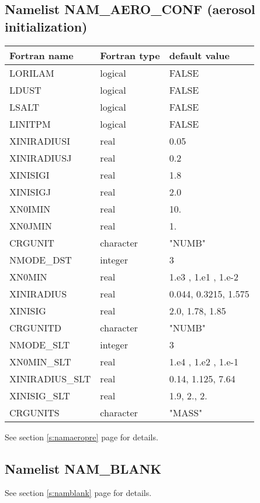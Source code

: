 \subsection{Namelist NAM\_AERO\_CONF (aerosol initialization)}
\begin{longtable} {|p{}|p{}|p{}|}
\hline
Fortran name &  Fortran type & default value \\
\hline 
\endhead
\hline
\endfoot
LORILAM      & logical       & FALSE    \\
LDUST        & logical       & FALSE    \\
LSALT        & logical       & FALSE    \\
LINITPM      & logical       & FALSE    \\
XINIRADIUSI  & real          & 0.05     \\
XINIRADIUSJ  & real          & 0.2      \\
XINISIGI     & real          & 1.8      \\
XINISIGJ     & real          & 2.0      \\
XN0IMIN      & real          & 10.      \\
XN0JMIN      & real          & 1.       \\
CRGUNIT      & character     & "NUMB"   \\
NMODE\_DST   & integer       & 3       \\
XN0MIN       & real          & 1.e3 , 1.e1 , 1.e-2 \\
XINIRADIUS   & real          & 0.044, 0.3215, 1.575 \\
XINISIG      & real          & 2.0, 1.78, 1.85 \\
CRGUNITD     & character     & "NUMB"   \\
NMODE\_SLT   & integer       & 3       \\
XN0MIN\_SLT  & real          & 1.e4 , 1.e2 , 1.e-1 \\
XINIRADIUS\_SLT & real       & 0.14, 1.125,  7.64\\
XINISIG\_SLT    & real       & 1.9, 2., 2. \\
CRGUNITS     & character     & "MASS"   \\
\end{longtable}

See section \ref{s:namaeropre} page \pageref{s:namaeropre} for details.
			  
			  
\subsection{Namelist NAM\_BLANK}
See section \ref{s:namblank} page \pageref{s:namblank} for details.

